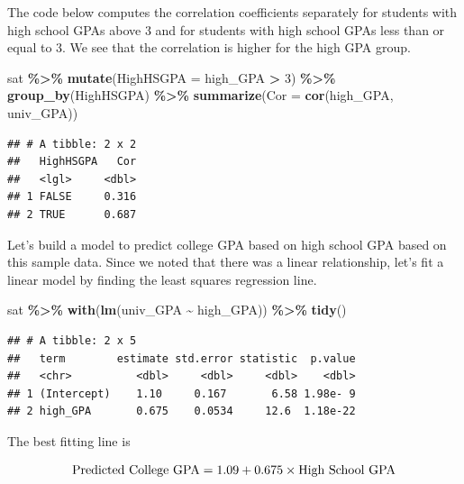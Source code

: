 \documentclass[
]{book}
\newenvironment{Shaded}{\begin{snugshade}}{\end{snugshade}}
\newcommand{\AttributeTok}[1]{\textcolor[rgb]{0.13,0.29,0.53}{#1}}
\newcommand{\DecValTok}[1]{\textcolor[rgb]{0.00,0.00,0.81}{#1}}
\newcommand{\FunctionTok}[1]{\textcolor[rgb]{0.13,0.29,0.53}{\textbf{#1}}}
\newcommand{\NormalTok}[1]{#1}
\newcommand{\SpecialCharTok}[1]{\textcolor[rgb]{0.81,0.36,0.00}{\textbf{#1}}}
\begin{document}
The code below computes the correlation coefficients separately for students with high school GPAs above 3 and for students with high school GPAs less than or equal to 3. We see that the correlation is higher for the high GPA group.

\begin{Shaded}
\begin{Highlighting}[]
\NormalTok{sat }\SpecialCharTok{\%\textgreater{}\%}
    \FunctionTok{mutate}\NormalTok{(}\AttributeTok{HighHSGPA =}\NormalTok{ high\_GPA }\SpecialCharTok{\textgreater{}} \DecValTok{3}\NormalTok{) }\SpecialCharTok{\%\textgreater{}\%}
    \FunctionTok{group\_by}\NormalTok{(HighHSGPA) }\SpecialCharTok{\%\textgreater{}\%}
    \FunctionTok{summarize}\NormalTok{(}\AttributeTok{Cor =} \FunctionTok{cor}\NormalTok{(high\_GPA, univ\_GPA))}
\end{Highlighting}
\end{Shaded}

\begin{verbatim}
## # A tibble: 2 x 2
##   HighHSGPA   Cor
##   <lgl>     <dbl>
## 1 FALSE     0.316
## 2 TRUE      0.687
\end{verbatim}

Let's build a model to predict college GPA based on high school GPA based on this sample data. Since we noted that there was a linear relationship, let's fit a linear model by finding the least squares regression line.

\begin{Shaded}
\begin{Highlighting}[]
\NormalTok{sat }\SpecialCharTok{\%\textgreater{}\%}
  \FunctionTok{with}\NormalTok{(}\FunctionTok{lm}\NormalTok{(univ\_GPA }\SpecialCharTok{\textasciitilde{}}\NormalTok{ high\_GPA)) }\SpecialCharTok{\%\textgreater{}\%}
  \FunctionTok{tidy}\NormalTok{()}
\end{Highlighting}
\end{Shaded}

\begin{verbatim}
## # A tibble: 2 x 5
##   term        estimate std.error statistic  p.value
##   <chr>          <dbl>     <dbl>     <dbl>    <dbl>
## 1 (Intercept)    1.10     0.167       6.58 1.98e- 9
## 2 high_GPA       0.675    0.0534     12.6  1.18e-22
\end{verbatim}

The best fitting line is

\[ \hbox{Predicted College GPA} = 1.09 + 0.675 \times \hbox{High School GPA} \]
\end{document}
